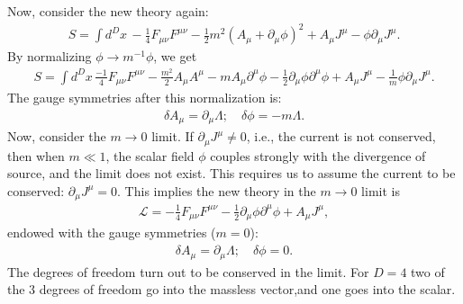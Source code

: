 \documentclass{book}
\theoremstyle{definition}
\newcommand{\p}{\partial}
\newcommand{\lag}{\mathcal{L}}
\newcommand{\f}[2]{\frac{#1}{#2}}
\newcommand{\lp}{\left(}
\newcommand{\rp}{\right)}
\begin{document}
Now, consider the new theory again:
\begin{align}
S = \int d^Dx\, -\f{1}{4}F_{\mu\nu}F^{\mu\nu} -\f{1}{2}m^2\lp A_\mu + \p_\mu \phi \rp^2 + A_\mu J^\mu - \phi \p_\mu J^\mu.
\end{align} 
By normalizing $\phi \to m^{-1}\phi$, we get
\begin{align}
S = \int d^Dx\, \f{-1}{4}F_{\mu\nu}F^{\mu\nu} -\f{m^2}{2} A_\mu A^\mu - mA_\mu \p^\mu \phi - \f{1}{2}\p_\mu \phi \p^\mu \phi + A_\mu J^\mu-\f{1}{m}\phi \p_\mu J^\mu.
\end{align}
The gauge symmetries after this normalization is:
\begin{align}
\delta A_\mu = \p_\mu \Lambda; \quad \delta \phi = -m\Lambda.
\end{align}
Now, consider the $m\to 0$ limit. If $\p_\mu  J^\mu \neq 0$, i.e., the current is not conserved, then when $m \ll 1$, the scalar field $\phi$ couples strongly with the divergence of source, and the limit does not exist. This requires us to assume the current to be conserved: $\p_\mu J^\mu = 0$. This implies the new theory in the $m\to 0$ limit is 
\begin{align}
\lag = -\f{1}{4}F_{\mu\nu}F^{\mu\nu} - \f{1}{2}\p_\mu \phi \p^\mu \phi + A_\mu J^\mu,
\end{align}
endowed with the gauge symmetries ($m=0$):
\begin{align}
\delta A_\mu = \p_\mu \Lambda; \quad \delta \phi = 0.
\end{align}
The degrees of freedom turn out to be conserved in the limit. For $D=4$ two of the 3 degrees of freedom go into the massless vector,and one goes into the scalar. \\
\end{document}
